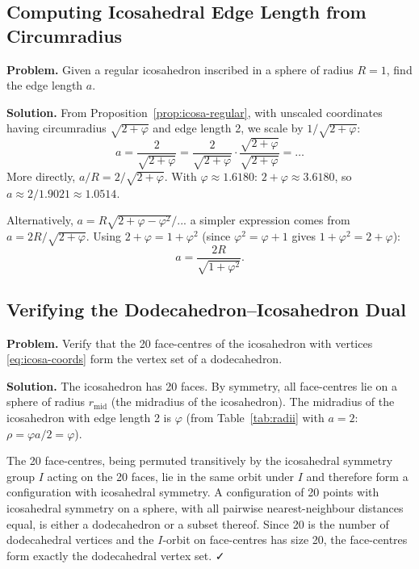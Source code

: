 \subsection{Computing Icosahedral Edge Length from Circumradius}
\label{subsec:example-icosa-edge}

\textbf{Problem.} Given a regular icosahedron inscribed in a sphere of
radius $R = 1$, find the edge length $a$.

\textbf{Solution.} From Proposition~\ref{prop:icosa-regular}, with unscaled
coordinates having circumradius $\sqrt{2+\varphi}$ and edge length 2, we scale
by $1/\sqrt{2+\varphi}$:
\[
  a = \frac{2}{\sqrt{2+\varphi}} = \frac{2}{\sqrt{2+\varphi}} \cdot \frac{\sqrt{2+\varphi}}{\sqrt{2+\varphi}} = \ldots
\]
More directly, $a/R = 2/\sqrt{2+\varphi}$.  With $\varphi \approx 1.6180$:
$2+\varphi \approx 3.6180$, so $a \approx 2/1.9021 \approx 1.0514$.

Alternatively, $a = R\sqrt{2+\varphi-\varphi^2}/... $ a simpler expression comes from
$a = 2R/\sqrt{2+\varphi}$.  Using $2+\varphi = 1+\varphi^2$ (since $\varphi^2 = \varphi+1$
gives $1+\varphi^2 = 2+\varphi$):
\[
  \boxed{a = \frac{2R}{\sqrt{1+\varphi^2}}}.
\]

\subsection{Verifying the Dodecahedron–Icosahedron Dual}
\label{subsec:example-dual-verify}

\textbf{Problem.} Verify that the 20 face-centres of the icosahedron with
vertices \eqref{eq:icosa-coords} form the vertex set of a dodecahedron.

\textbf{Solution.}  The icosahedron has 20 faces.  By symmetry, all face-centres
lie on a sphere of radius $r_{\text{mid}}$ (the midradius of the icosahedron).
The midradius of the icosahedron with edge length 2 is $\varphi$ (from
Table~\ref{tab:radii} with $a=2$: $\rho = \varphi a/2 = \varphi$).

The 20 face-centres, being permuted transitively by the icosahedral symmetry group
$I$ acting on the 20 faces, lie in the same orbit under $I$ and therefore form a
configuration with icosahedral symmetry.  A configuration of 20 points with
icosahedral symmetry on a sphere, with all pairwise nearest-neighbour distances
equal, is either a dodecahedron or a subset thereof.  Since 20 is the number of
dodecahedral vertices and the $I$-orbit on face-centres has size 20, the
face-centres form exactly the dodecahedral vertex set. ✓

